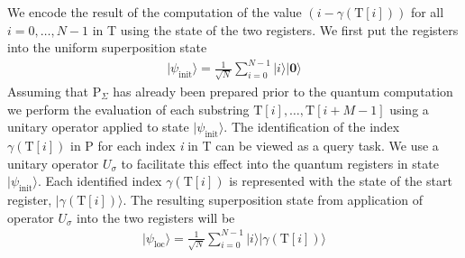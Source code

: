 We encode the result of the computation of the value $(i-\gamma(\mathrm{T}[i]))$ for all $i=0,\ldots,N-1$ in T using the state of the two registers. We first put the registers into the uniform superposition state
\begin{align}
	\label{eqn:superposition-state}
	\vert \psi_{\mathrm{init}} \rangle = \frac{1}{\sqrt{N}} \sum_{i=0}^{N-1} \vert i \rangle \vert \mathbf{0} \rangle
\end{align}
Assuming that $\text{P}_{\Sigma}$ has already been prepared prior to the quantum computation we perform the evaluation of each substring $\mathrm{T}[i],\ldots,\mathrm{T}[i+M-1]$ using a unitary operator applied to state $\vert \psi_{\mathrm{init}} \rangle$. The identification of the index $\gamma(\text{T}[i])$ in P for each index \textit{i} in T can be viewed as a query task. We use a unitary operator $U_{\sigma}$ to facilitate this effect into the quantum registers in state $\vert \psi_{\mathrm{init}} \rangle$. Each identified index $\gamma(\text{T}[i])$ is represented with the state of the start register, $\vert \gamma(\text{T}[i]) \rangle$. The resulting superposition state from application of operator $U_{\sigma}$ into the two registers will be
\begin{align}\label{eqn:psi-loc}
	\vert \psi_{\mathrm{loc}} \rangle = \frac{1}{\sqrt{N}} \sum_{i=0}^{N-1} \vert i \rangle \vert \gamma(\text{T}[i]) \rangle
\end{align}


